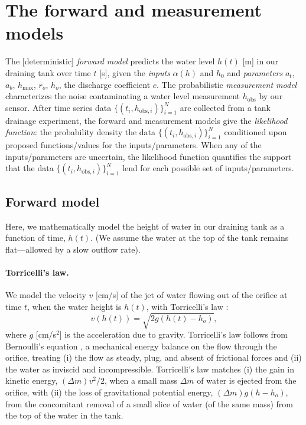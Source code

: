 \documentclass[openacc]{rsproca_new}%
\newcommand\thedata {$\{(t_i,h_{\text{obs}, i})\}_{i=1}^{N}$\xspace}
\begin{document}
\section{The forward and measurement models} \label{sec:forward_model}
The [deterministic] \emph{forward model} predicts the water level $h(t)$ [m] in our draining tank over time $t$ [s], given the \emph{inputs} $\alpha(h)$ and $h_0$ and \emph{parameters} $a_t$, $a_b$, $h_{\text{max}}$, $r_o$, $h_o$, the discharge coefficient $c$. 
The probabilistic \emph{measurement model} characterizes the noise contaminating a water level measurement $h_{\text{obs}}$ by our sensor.
After time series data \thedata are collected from a tank drainage experiment, the forward and measurement models give the \emph{likelihood function}: the probability density the data \thedata conditioned upon proposed functions/values for the inputs/parameters. 
When any of the inputs/parameters are uncertain, the likelihood function quantifies the support that the data \thedata lend for each possible set of inputs/parameters.

\subsection{Forward model}
Here, we mathematically model the height of water in our draining tank as a function of time, $h(t)$. (We assume the water at the top of the tank remains flat---allowed by a slow outflow rate). 


\paragraph{Torricelli's law.}
We model the velocity $v$ [cm/s] of the jet of water flowing out of the orifice at time $t$, when the water height is $h(t)$, with Torricelli's law \cite{d2021torricelli}:
\begin{equation}
	v(h(t)) =  \sqrt{2 g(h(t)-h_o)}, \label{eq:Torricelli}
\end{equation} where $g$ [cm/s$^2$] is the acceleration due to gravity. Torricelli's law follows from Bernoulli's equation \cite{welty2020fundamentals}, a mechanical energy balance on the flow through the orifice, treating (i) the flow as steady, plug, and absent of frictional forces and (ii) the water as inviscid and incompressible.
Torricelli's law matches (i) the gain in kinetic energy, $(\Delta m) v^2/2$, when a small mass $\Delta m$ of water is ejected from the orifice, with (ii) the loss of gravitational potential energy, $(\Delta m)g(h-h_o)$, from the concomitant removal of a small slice of water (of the same mass) from the top of the water in the tank. \cite{groetsch1993inverse,driver1998torricelli,williams2021vessel}
\end{document}
